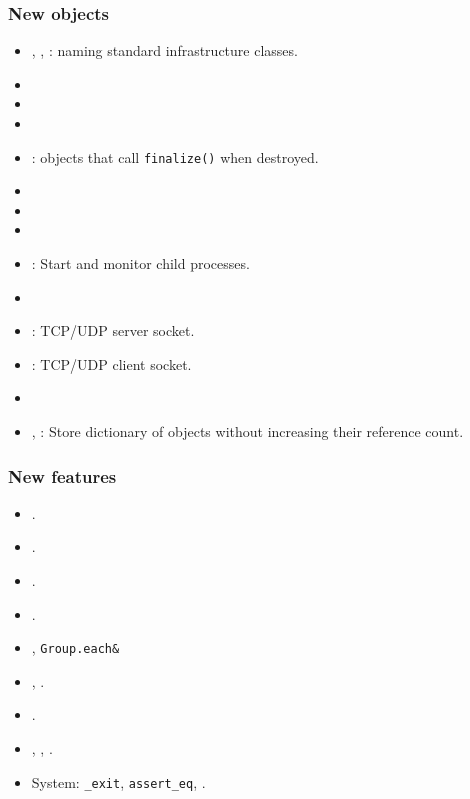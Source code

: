 \subsubsection{New objects}
\begin{itemize}
\item {}, , :
  naming standard infrastructure classes.
\item {}
\item {}
\item {}
\item {}: objects that call \lstinline|finalize()| when
  destroyed.
\item {}
\item {}
\item {}
\item {}: Start and monitor child processes.
\item {}
\item {}: TCP/UDP server socket.
\item {}: TCP/UDP client socket.
\item {}
\item {}, : Store
  dictionary of objects without increasing their reference count.
\end{itemize}

\subsubsection{New features}
\begin{itemize}
\item {}.
\item {}.
\item {}.
\item {}.
\item {}, \lstinline|Group.each&|
\item {}, 
  .
\item {}.
\item {}, ,
  .
\item System: \lstinline|_exit|, \lstinline|assert_eq|,
  .
\end{itemize}

